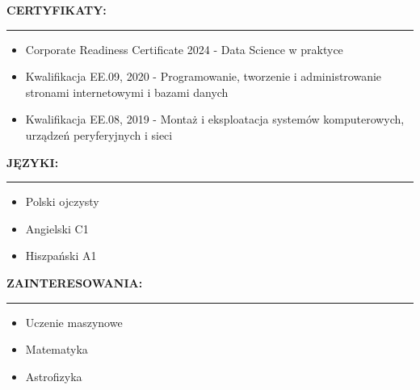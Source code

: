 \documentclass[10pt]{article}
\newcommand{\longline}{\rule{19.6cm}{1pt}}
\begin{document}
\noindent \fontsize{14pt}{14pt}\selectfont \textbf{\color{Violet}CERTYFIKATY:}
\fontsize{10pt}{10pt}\selectfont 
\\ 
\noindent \longline 
\begin{itemize}[leftmargin=*]
    \item Corporate Readiness Certificate 2024 - Data Science w praktyce
    \item Kwalifikacja EE.09, 2020 - Programowanie, tworzenie i administrowanie stronami internetowymi i bazami danych 
    \item Kwalifikacja EE.08, 2019 - Montaż i eksploatacja systemów komputerowych, urządzeń peryferyjnych i sieci
\end{itemize}

\noindent \fontsize{14pt}{14pt}\selectfont \textbf{\color{Violet}JĘZYKI:}
\fontsize{10pt}{10pt}\selectfont
\\
\noindent \longline 
\begin{itemize}[leftmargin=*]
    \item Polski ojczysty
    \item Angielski C1
    \item Hiszpański A1
\end{itemize}

\noindent \fontsize{14pt}{14pt}\selectfont \textbf{\color{Violet}ZAINTERESOWANIA:}
\fontsize{10pt}{10pt}\selectfont
\\
\noindent \longline 
\begin{itemize}[leftmargin=*]
    \item Uczenie maszynowe
    \item Matematyka
    \item Astrofizyka
\end{itemize}
\end{document}
